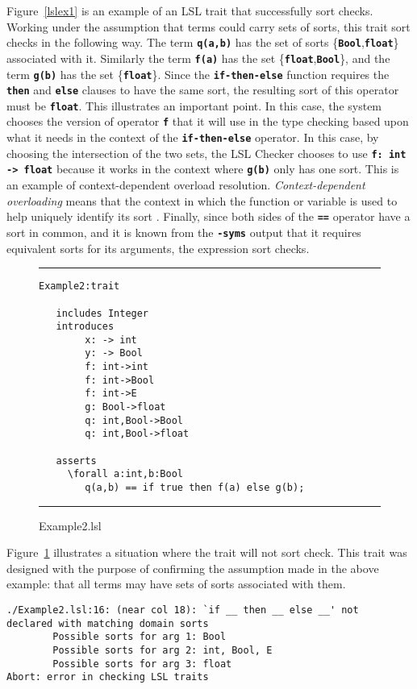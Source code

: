 \documentclass[12pt]{article} %
\newcommand{\reserved}[1]{\textbf{\texttt{#1}}} %
\newcommand{\UNSPACEFORBOX}{\vspace{-2ex}}
\newcommand{\HLINE}{\UNSPACEFORBOX%
\begin{flushleft}\rule{\textwidth}{0.01in}\end{flushleft}%
\UNSPACEFORBOX}
\newenvironment{BFIGURE}{

\begin{figure}
\small
\HLINE
}{
\HLINE
\normalsize
\end{figure}
}
\begin{document}
Figure~\ref{lslex1} is an example of an LSL trait that successfully
sort checks. Working under the assumption that terms could carry sets
of sorts, this trait sort checks in the following way. The term
\reserved{q(a,b)} has the set of sorts
\{\reserved{Bool},\reserved{float}\} associated with it. Similarly the
term \reserved{f(a)} has the set
\{\reserved{float},\reserved{Bool}\}, and the term \reserved{g(b)}
has the set \{\reserved{float}\}. Since the
\reserved{if-then-else} function requires the \reserved{then} and
\reserved{else} clauses to have the same sort, the
resulting sort of this operator must be \reserved{float}. This
illustrates an important point. In this case, the system chooses the
version of operator \reserved{f} that it will use in the type checking
based upon what it needs in the context of the \reserved{if-then-else}
operator. In this case, by choosing the intersection
of the two sets, the LSL Checker chooses to use \reserved{f:~int -> float} because it
works in the context where \reserved{g(b)} only has one sort. This is an
example of context-dependent overload
resolution. \emph{Context-dependent overloading} means that the
context in which the function or variable is used to help uniquely identify
its sort \cite{Watt90}. Finally, since both sides of the \reserved{==}
operator have a sort in common, and it is known from the
\reserved{-syms} output that it requires equivalent sorts for its
arguments, the expression sort checks. 

\begin{BFIGURE}
\begin{verbatim}
Example2:trait

   includes Integer
   introduces
        x: -> int
        y: -> Bool
        f: int->int
        f: int->Bool
        f: int->E
        g: Bool->float
        q: int,Bool->Bool
        q: int,Bool->float

   asserts
     \forall a:int,b:Bool
        q(a,b) == if true then f(a) else g(b);
\end{verbatim}
\caption{Example2.lsl}
\label{lslex2}
\end{BFIGURE}

Figure~\ref{lslex2} illustrates a situation where the trait will not
sort check. This trait was designed with the purpose of confirming the
assumption made in the above example: that all terms may have sets of
sorts associated with them.

\begin{verbatim}
./Example2.lsl:16: (near col 18): `if __ then __ else __' not 
declared with matching domain sorts
        Possible sorts for arg 1: Bool
        Possible sorts for arg 2: int, Bool, E
        Possible sorts for arg 3: float
Abort: error in checking LSL traits
\end{verbatim}
\end{document}
